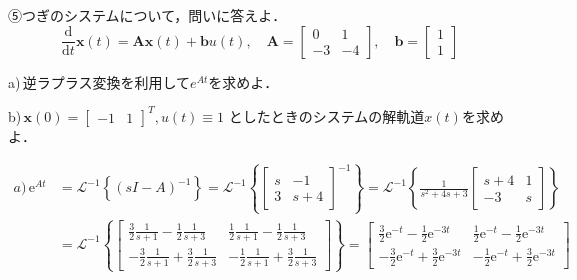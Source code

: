 ⑤つぎのシステムについて，問いに答えよ．
$$
\frac{\mathrm{d}}{\mathrm{d} t} \boldsymbol{x}(t)=\boldsymbol{A} \boldsymbol{x}(t)+\boldsymbol{b} u(t), \quad \boldsymbol{A}=\left[\begin{array}{cc}
0 & 1 \\
-3 & -4
\end{array}\right], \quad \boldsymbol{b}=\left[\begin{array}{l}
1 \\
1
\end{array}\right]
$$

a)\,逆ラプラス変換を利用して$e^{At}$を求めよ．


b)\,$\boldsymbol{x}(0)=\left[\begin{array}{ll}-1 & 1\end{array}\right]^T, u(t) \equiv 1$
としたときのシステムの解軌道$x(t)$を求めよ．


$$
\begin{aligned}
    a)\,
    \mathrm{e}^{A t} & =\mathcal{L}^{-1}\left\{(s I-A)^{-1}\right\}=\mathcal{L}^{-1}\left\{\left[\begin{array}{cc}
    s & -1 \\
    3 & s+4
    \end{array}\right]^{-1}\right\}=\mathcal{L}^{-1}\left\{\frac{1}{s^2+4 s+3}\left[\begin{array}{cc}
    s+4 & 1 \\
    -3 & s
    \end{array}\right]\right\} \\
    & =\mathcal{L}^{-1}\left\{\left[\begin{array}{cc}
    \frac{3}{2} \frac{1}{s+1}-\frac{1}{2} \frac{1}{s+3} & \frac{1}{2} \frac{1}{s+1}-\frac{1}{2} \frac{1}{s+3} \\
    -\frac{3}{2} \frac{1}{s+1}+\frac{3}{2} \frac{1}{s+3} & -\frac{1}{2} \frac{1}{s+1}+\frac{3}{2} \frac{1}{s+3}
    \end{array}\right]\right\}=\left[\begin{array}{cc}
    \frac{3}{2} \mathrm{e}^{-t}-\frac{1}{2} \mathrm{e}^{-3 t} & \frac{1}{2} \mathrm{e}^{-t}-\frac{1}{2} \mathrm{e}^{-3 t} \\
    -\frac{3}{2} \mathrm{e}^{-t}+\frac{3}{2} \mathrm{e}^{-3 t} & -\frac{1}{2} \mathrm{e}^{-t}+\frac{3}{2} \mathrm{e}^{-3 t}
    \end{array}\right]
\end{aligned}
$$


